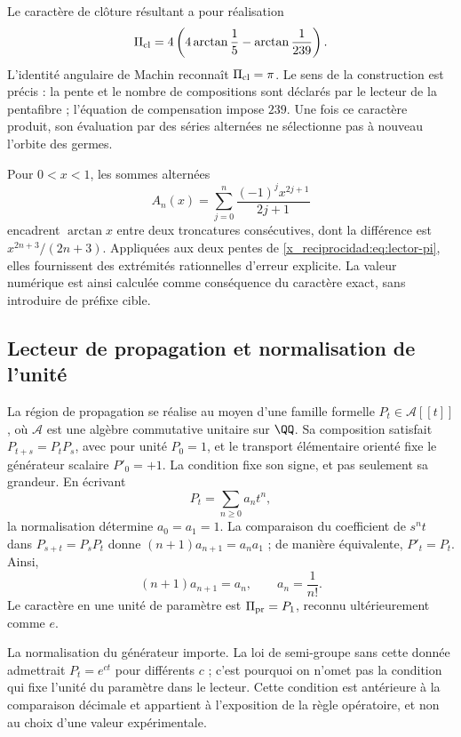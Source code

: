 Le caractère de clôture résultant a pour réalisation
\begin{equation}
 \Pi_{\rm cl}=4\left(4\arctan\frac15-\arctan\frac1{239}\right).
 \label{x_reciprocidad:eq:lector-pi}
\end{equation}
L'identité angulaire de Machin reconnaît \(\Pi_{\rm cl}=\pi\). Le sens de la construction est précis : la pente et le nombre de compositions sont déclarés par le lecteur de la pentafibre ; l'équation de compensation impose \(239\). Une fois ce caractère produit, son évaluation par des séries alternées ne sélectionne pas à nouveau l'orbite des germes.

Pour \(0<x<1\), les sommes alternées
\[
 A_n(x)=\sum_{j=0}^n\frac{(-1)^jx^{2j+1}}{2j+1}
\]
encadrent \(\arctan x\) entre deux troncatures consécutives, dont la différence est \(x^{2n+3}/(2n+3)\). Appliquées aux deux pentes de \eqref{x_reciprocidad:eq:lector-pi}, elles fournissent des extrémités rationnelles d'erreur explicite. La valeur numérique est ainsi calculée comme conséquence du caractère exact, sans introduire de préfixe cible.

\subsection{Lecteur de propagation et normalisation de l'unité}

La région de propagation se réalise au moyen d'une famille formelle \(P_t\in\mathcal A[[t]]\), où \(\mathcal A\) est une algèbre commutative unitaire sur \(\QQ\). Sa composition satisfait \(P_{t+s}=P_tP_s\), avec pour unité \(P_0=1\), et le transport élémentaire orienté fixe le générateur scalaire \(P'_0=+1\). La condition fixe son signe, et pas seulement sa grandeur. En écrivant
\[
 P_t=\sum_{n\ge0}a_nt^n,
\]
la normalisation détermine \(a_0=a_1=1\). La comparaison du coefficient de \(s^nt\) dans \(P_{s+t}=P_sP_t\) donne \((n+1)a_{n+1}=a_na_1\) ; de manière équivalente, \(P'_t=P_t\). Ainsi,
\begin{equation}
 (n+1)a_{n+1}=a_n,\qquad a_n=\frac1{n!}.
 \label{x_reciprocidad:eq:propagacion}
\end{equation}
Le caractère en une unité de paramètre est \(\Pi_{\rm pr}=P_1\), reconnu ultérieurement comme \(e\).

La normalisation du générateur importe. La loi de semi-groupe sans cette donnée admettrait \(P_t=e^{ct}\) pour différents \(c\) ; c'est pourquoi on n'omet pas la condition qui fixe l'unité du paramètre dans le lecteur. Cette condition est antérieure à la comparaison décimale et appartient à l'exposition de la règle opératoire, et non au choix d'une valeur expérimentale.

